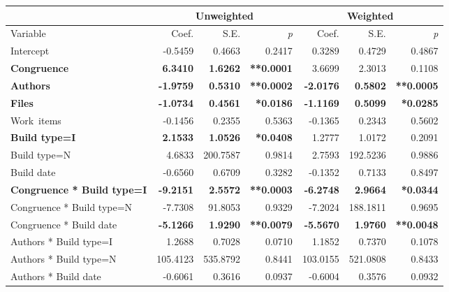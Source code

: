 \begin{table}
\begin{center}
\begin{tabular}{l|rrr|rrr}
 & \multicolumn{3}{c|}{Unweighted} & \multicolumn{3}{c}{Weighted} \\\hline
Variable & Coef. & S.E. & \emph{p} & Coef. & S.E. & \emph{p} \\
	\hline
Intercept                   &  -0.5459 &   0.4663 & 0.2417 &    0.3289 &    0.4729 &   0.4867 \\
\textbf{Congruence}              &   \textbf{6.3410} &   \textbf{1.6262} & \textbf{**0.0001} &    3.6699 &    2.3013 &   0.1108 \\
\textbf{Authors}                     &  \textbf{-1.9759} &   \textbf{0.5310} & \textbf{**0.0002} &   \textbf{-2.0176} &    \textbf{0.5802} &   \textbf{**0.0005} \\
\textbf{Files}                       &  \textbf{-1.0734} &   \textbf{0.4561} & \textbf{*0.0186} &   \textbf{-1.1169} &    \textbf{0.5099} &   \textbf{*0.0285} \\
Work~items                   &  -0.1456 &   0.2355 & 0.5363 &   -0.1365 &    0.2343 &   0.5602 \\
\textbf{Build type=I}                      &   \textbf{2.1533} &   \textbf{1.0526} & \textbf{*0.0408} &    1.2777 &    1.0172 &   0.2091 \\
Build type=N                      &   4.6833 & 200.7587 & 0.9814 &    2.7593 &  192.5236 &   0.9886 \\
Build date                   &  -0.6560 &   0.6709 & 0.3282 &   -0.1352 &    0.7133 &   0.8497 \\
\textbf{Congruence * Build type=I}     &  \textbf{-9.2151} &   \textbf{2.5572} & \textbf{**0.0003} &   \textbf{-6.2748} &    \textbf{2.9664} &   \textbf{*0.0344} \\
Congruence * Build type=N     &  -7.7308 &  91.8053 & 0.9329 &   -7.2024 &  188.1811 &   0.9695 \\
Congruence * Build date  &  \textbf{-5.1266} &   \textbf{1.9290} & \textbf{**0.0079} &   \textbf{-5.5670} &    \textbf{1.9760} &   \textbf{**0.0048} \\
Authors * Build type=I            &   1.2688 &   0.7028 & 0.0710 &    1.1852 &    0.7370 &   0.1078 \\
Authors * Build type=N            & 105.4123 & 535.8792 & 0.8441 &  103.0155 &  521.0808 &   0.8433 \\
Authors * Build date         &  -0.6061 &   0.3616 & 0.0937 &   -0.6004 &    0.3576 &   0.0932 \\

\end{tabular}
\end{center}
\end{table}
